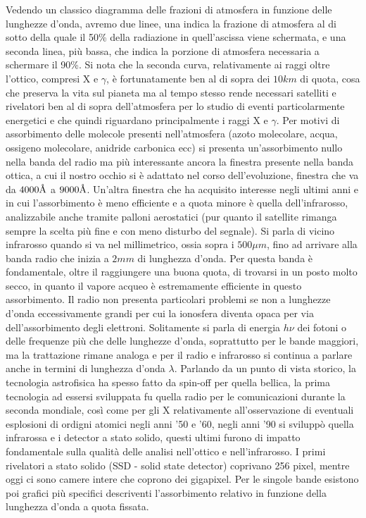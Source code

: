 \documentclass[a4paper,twoside,openany,notitlepage]{book}
\newcommand{\angstrom}{\mbox{\normalfont\AA}}
\theoremstyle{definition}
\theoremstyle{plain}
\begin{document}
Vedendo un classico diagramma delle frazioni di atmosfera in funzione delle lunghezze d'onda, avremo due linee, una indica la frazione di atmosfera al di sotto della quale il 50\% della radiazione in quell'ascissa viene schermata, e una seconda linea, più bassa, che indica la porzione di atmosfera necessaria a schermare il 90\%. Si nota che la seconda curva, relativamente ai raggi oltre l'ottico, compresi X e $\gamma$, è fortunatamente ben al di sopra dei $10km$ di quota, cosa che preserva la vita sul pianeta ma al tempo stesso rende necessari satelliti e rivelatori ben al di sopra dell'atmosfera per lo studio di eventi particolarmente energetici e che quindi riguardano principalmente i raggi X e $\gamma$. Per motivi di assorbimento delle molecole presenti nell'atmosfera (azoto molecolare, acqua, ossigeno molecolare, anidride carbonica ecc) si presenta un'assorbimento nullo nella banda del radio ma più interessante ancora la finestra presente nella banda ottica, a cui il nostro occhio si è adattato nel corso dell'evoluzione, finestra che va da $4000\angstrom$ a $9000\angstrom$. Un'altra finestra che ha acquisito interesse negli ultimi anni e in cui l'assorbimento è meno efficiente e a quota minore è quella dell'infrarosso, analizzabile anche tramite palloni aerostatici (pur quanto il satellite rimanga sempre la scelta più fine e con meno disturbo del segnale). Si parla di vicino infrarosso quando si va nel millimetrico, ossia sopra i $500\mu m$, fino ad arrivare alla banda radio che inizia a $2mm$ di lunghezza d'onda. Per questa banda è fondamentale, oltre il raggiungere una buona quota, di trovarsi in un posto molto secco, in quanto il vapore acqueo è estremamente efficiente in questo assorbimento. Il radio non presenta particolari problemi se non a lunghezze d'onda eccessivamente grandi per cui la ionosfera diventa opaca per via dell'assorbimento degli elettroni. Solitamente si parla di energia $h\nu$ dei fotoni o delle frequenze più che delle lunghezze d'onda, soprattutto per le bande maggiori, ma la trattazione rimane analoga e per il radio e infrarosso si continua a parlare anche in termini di lunghezza d'onda $\lambda$. Parlando da un punto di vista storico, la tecnologia astrofisica ha spesso fatto da spin-off per quella bellica, la prima tecnologia ad essersi sviluppata fu quella radio per le comunicazioni durante la seconda mondiale, così come per gli X relativamente all'osservazione di eventuali esplosioni di ordigni atomici negli anni '50 e '60, negli anni '90 si sviluppò quella infrarossa e i detector a stato solido, questi ultimi furono di impatto fondamentale sulla qualità delle analisi nell'ottico e nell'infrarosso. I primi rivelatori a stato solido (SSD - solid state detector) coprivano 256 pixel, mentre oggi ci sono camere intere che coprono dei gigapixel. Per le singole bande esistono poi grafici più specifici descriventi l'assorbimento relativo in funzione della lunghezza d'onda a quota fissata.
\end{document}

